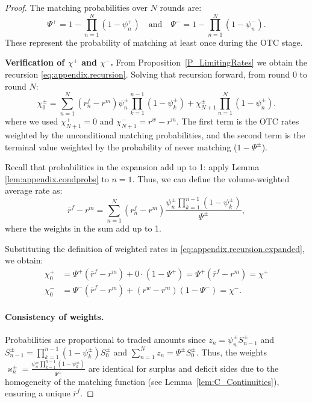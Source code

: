 \begin{proof}
The matching probabilities over $N$ rounds are:
\[
\Psi^{+} = 1-\prod_{n=1}^{N}(1-\psi_{n}^{+}) \quad \text{and} \quad \Psi^{-} = 1-\prod_{n=1}^{N}(1-\psi_{n}^{-}).
\]
These represent the probability of matching at least once during the OTC stage.

\textbf{Verification of $\chi^+$ and $\chi^-$.} From Proposition~\ref{P_LimitingRates} we obtain the recursion \eqref{eq:appendix.recursion}. Solving that recursion forward, from round $0$ to round $N$:
\begin{equation}
\label{eq:appendix.recursion.expanded}
\chi_{0}^{\pm} = \sum_{n=1}^{N} (r_{n}^{f} - r^{m})\psi_{n}^{\pm}\prod_{k=1}^{n-1}(1-\psi_{k}^{\pm}) + \chi_{N+1}^{\pm}\prod_{n=1}^{N}(1-\psi_{n}^{\pm}).
\end{equation}
where we used $\chi_{N+1}^{+} = 0$ and $\chi_{N+1}^{-} = r^{w} - r^{m}$.
The first term is the OTC rates weighted by the unconditional matching probabilities, and the second term is the terminal value weighted by the probability of never matching ($1-\Psi^{\pm}$). 

Recall that probabilities in the expansion add up to 1: apply Lemma \ref{lem:appendix.condprobs} to $n=1$. Thus, we can define the volume-weighted average rate as:
\[
\overline{r}^{f} -r^{m} =   \sum_{n=1}^{N} (r_{n}^{f} - r^{m})\frac{\psi_{n}^{\pm}\prod_{k=1}^{n-1}(1-\psi_{k}^{\pm})}{\Psi^{\pm}},
\] where the weights in the sum add up to 1. 

Substituting the definition of weighted rates in \eqref{eq:appendix.recursion.expanded}, we obtain:
\begin{align*}
\chi_{0}^{+} &= \Psi^{+}(\overline{r}^{f} - r^{m}) + 0 \cdot (1-\Psi^{+}) = \Psi^{+}(\overline{r}^{f} - r^{m}) = \chi^{+}\\
\chi_{0}^{-} &= \Psi^{-}(\overline{r}^{f} - r^{m}) + (r^{w} - r^{m})(1-\Psi^{-}) = \chi^{-}.
\end{align*}

\paragraph{Consistency of weights.}
Probabilities are proportional to traded amounts since $z_n=\psi_n^{\pm}S^{\pm}_{n-1}$ and $S^{\pm}_{n-1}=\prod_{k=1}^{n-1}(1-\psi_{k}^{\pm})S^{\pm}_{0}$ and $\sum_{n=1}^{N}z_n=\Psi^{\pm}S^{\pm}_{0}.$ Thus, the weights $\varkappa_{n}^{\pm} = \frac{\psi_{n}^{\pm}\prod_{k=1}^{n-1}(1-\psi_{k}^{\pm})}{\Psi^{\pm}}$ are identical for surplus and deficit sides due to the homogeneity of the matching function (see Lemma~\ref{lem:C_Continuities}), ensuring a unique $\overline{r}^{f}$. 
\end{proof}